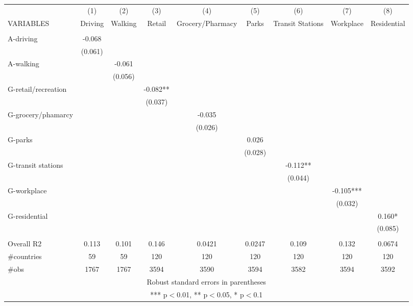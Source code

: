 \documentclass[]{article}
\begin{document}
\begin{tabular}{lcccccccc} \hline
 & (1) & (2) & (3) & (4) & (5) & (6) & (7) & (8) \\
VARIABLES & Driving & Walking & Retail & Grocery/Pharmacy & Parks & Transit Stations & Workplace & Residential \\ \hline
 &  &  &  &  &  &  &  &  \\
A-driving & -0.068 &  &  &  &  &  &  &  \\
 & (0.061) &  &  &  &  &  &  &  \\
A-walking &  & -0.061 &  &  &  &  &  &  \\
 &  & (0.056) &  &  &  &  &  &  \\
G-retail/recreation &  &  & -0.082** &  &  &  &  &  \\
 &  &  & (0.037) &  &  &  &  &  \\
G-grocery/phamarcy &  &  &  & -0.035 &  &  &  &  \\
 &  &  &  & (0.026) &  &  &  &  \\
G-parks &  &  &  &  & 0.026 &  &  &  \\
 &  &  &  &  & (0.028) &  &  &  \\
G-transit stations &  &  &  &  &  & -0.112** &  &  \\
 &  &  &  &  &  & (0.044) &  &  \\
G-workplace &  &  &  &  &  &  & -0.105*** &  \\
 &  &  &  &  &  &  & (0.032) &  \\
G-residential &  &  &  &  &  &  &  & 0.160* \\
 &  &  &  &  &  &  &  & (0.085) \\
 &  &  &  &  &  &  &  &  \\
Overall R2 & 0.113 & 0.101 & 0.146 & 0.0421 & 0.0247 & 0.109 & 0.132 & 0.0674 \\
\#countries & 59 & 59 & 120 & 120 & 120 & 120 & 120 & 120 \\
 \#obs & 1767 & 1767 & 3594 & 3590 & 3594 & 3582 & 3594 & 3592 \\ \hline
\multicolumn{9}{c}{ Robust standard errors in parentheses} \\
\multicolumn{9}{c}{ *** p$<$0.01, ** p$<$0.05, * p$<$0.1} \\
\end{tabular}
\end{document}
